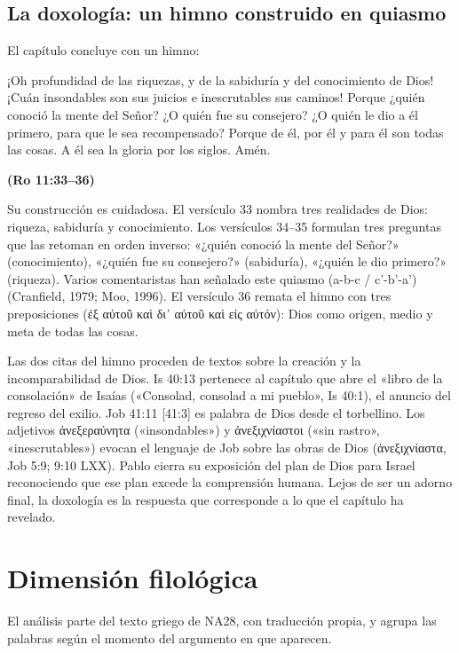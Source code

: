 \documentclass[11pt,letterpaper]{article}
\newcommand{\grc}[1]{\foreignlanguage{ancientgreek}{#1}}
\newcommand{\fuente}[1]{\par\hfill{\upshape\bfseries\small\textcolor{ladrillo}{#1}}}
\begin{document}
\subsection{La doxología: un himno construido en quiasmo}
El capítulo concluye con un himno:
\begin{cita}¡Oh profundidad de las riquezas, y de la sabiduría y del conocimiento de Dios! ¡Cuán insondables son sus juicios e inescrutables sus caminos! Porque ¿quién conoció la mente del Señor? ¿O quién fue su consejero? ¿O quién le dio a él primero, para que le sea recompensado? Porque de él, por él y para él son todas las cosas. A él sea la gloria por los siglos. Amén.\fuente{(Ro 11:33--36)}\end{cita}
Su construcción es cuidadosa. El versículo 33 nombra tres realidades de Dios: riqueza, sabiduría y conocimiento. Los versículos 34--35 formulan tres preguntas que las retoman en orden inverso: «¿quién conoció la mente del Señor?» (conocimiento), «¿quién fue su consejero?» (sabiduría), «¿quién le dio primero?» (riqueza). Varios comentaristas han señalado este quiasmo (a-b-c / c'-b'-a') (Cranfield, 1979; Moo, 1996). El versículo 36 remata el himno con tres preposiciones (\grc{ἐξ αὐτοῦ καὶ δι᾿ αὐτοῦ καὶ εἰς αὐτόν}): Dios como origen, medio y meta de todas las cosas.

Las dos citas del himno proceden de textos sobre la creación y la incomparabilidad de Dios. Is 40:13 pertenece al capítulo que abre el «libro de la consolación» de Isaías («Consolad, consolad a mi pueblo», Is 40:1), el anuncio del regreso del exilio. Job 41:11 [41:3] es palabra de Dios desde el torbellino. Los adjetivos \grc{ἀνεξεραύνητα} («insondables») y \grc{ἀνεξιχνίαστοι} («sin rastro», «inescrutables») evocan el lenguaje de Job sobre las obras de Dios (\grc{ἀνεξιχνίαστα}, Job 5:9; 9:10 LXX). Pablo cierra su exposición del plan de Dios para Israel reconociendo que ese plan excede la comprensión humana. Lejos de ser un adorno final, la doxología es la respuesta que corresponde a lo que el capítulo ha revelado.

\section{Dimensión filológica}\label{sec:filologica}

El análisis parte del texto griego de NA28, con traducción propia, y agrupa las palabras según el momento del argumento en que aparecen.
\end{document}
